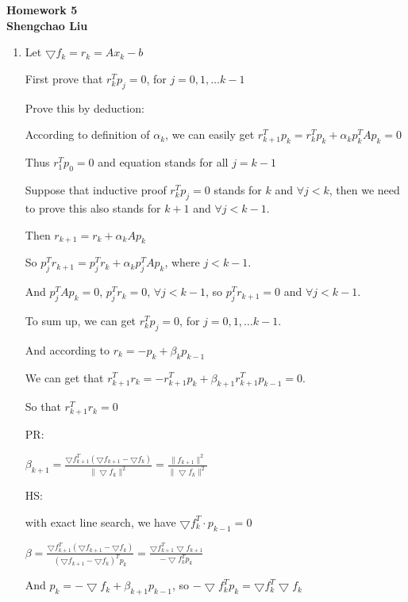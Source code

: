 \documentclass[12pt]{article}
\begin{document}
\begin{center} {\Large
{\bf Homework 5\\Shengchao Liu}}
\end{center}

\begin{enumerate}

\item

Let $\bigtriangledown f_k = r_k = A x_k - b$

First prove that $r_k^T p_j = 0$, for $j = 0,1, \hdots {k-1}$


Prove this by deduction:

According to definition of $\alpha_k$, we can easily get $r_{k+1}^T p_k = r_k^T p_k + \alpha_k p_k^T A p_k = 0$

Thus $r_1^T p_0 =0$ and equation stands for all $j=k-1$

Suppose that inductive proof $r_k^T p_j = 0$ stands for $k$ and $\forall j<k$, then we need to prove this also stands for $k+1$ and $\forall j<k-1$.

Then $r_{k+1} = r_k + \alpha_k A p_k$

So $p_j^T r_{k+1} = p_j^T r_k + \alpha_k p_j^TA p_k$, where $j < k-1$.

And $p_j^TA p_k=0$, $p_j^T r_k=0$,  $\forall j < k-1$, so $p_j^T r_{k+1}=0$ and $\forall j<k-1$.

To sum up, we can get $r_k^T p_j = 0$, for $j = 0,1, \hdots {k-1}$.

And according to $r_{k} = -p_{k} + \beta_{k} p_{k-1}$

We can get that $r_{k+1}^T r_{k} = - r_{k+1}^T p_{k} + \beta_{k+1} r_{k+1}^T p_{k-1} = 0$.

So that $r_{k+1}^T r_{k} = 0$

PR:

$\beta_{k+1} = \frac{\bigtriangledown f_{k+1}^T (\bigtriangledown f_{k+1} - \bigtriangledown f_{k} ) }{\|\bigtriangledown f_k\|^2} = \frac{\| f_{k+1} \|^2 }{\| \bigtriangledown f_k \|^2}$

HS:

with exact line search, we have $\bigtriangledown f_k^T \cdot p _{k-1} = 0$

$\beta = \frac{\bigtriangledown f^T_{k+1} ( \bigtriangledown f_{k+1} - \bigtriangledown f_k ) } { ( \bigtriangledown f_{k+1} - \bigtriangledown f_k )^T p_k } = \frac{\bigtriangledown f_{k+1}^T \bigtriangledown f_{k+1}}{ -\bigtriangledown f_k^T p_k}$

And $p_k = -\bigtriangledown f_k + \beta_{k+1} p_{k-1}$, so $-\bigtriangledown f_k^T p_k = \bigtriangledown f_k^T \bigtriangledown f_k$


\end{enumerate}
\end{document}
